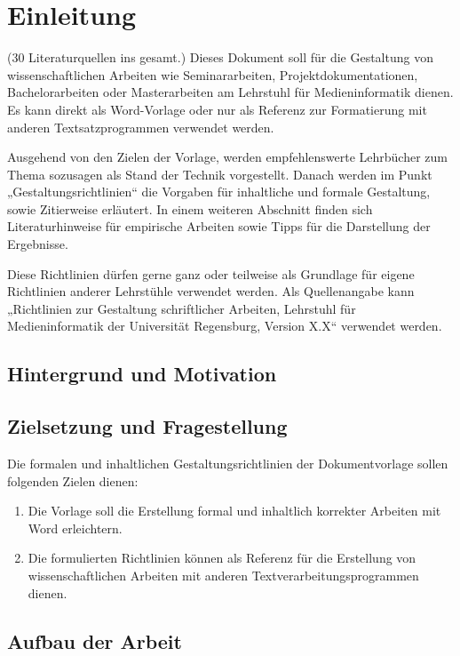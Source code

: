 \chapter{Einleitung}\label{sec:Einleitung}
\pagestyle{headings} %
(30 Literaturquellen ins gesamt.)
Dieses Dokument soll für die Gestaltung von wissenschaftlichen Arbeiten wie Seminararbeiten, Projektdokumentationen, Bachelorarbeiten oder Masterarbeiten am Lehrstuhl für Medieninformatik dienen. Es kann direkt als Word-Vorlage oder nur als Referenz zur Formatierung mit anderen Textsatzprogrammen verwendet werden. 

Ausgehend von den Zielen der Vorlage, werden empfehlenswerte Lehrbücher zum Thema sozusagen als Stand der Technik vorgestellt. Danach werden im Punkt „Gestaltungsrichtlinien“ die Vorgaben für inhaltliche und formale Gestaltung, sowie Zitierweise erläutert. In einem weiteren Abschnitt finden sich Literaturhinweise für empirische Arbeiten sowie Tipps für die Darstellung der Ergebnisse.

Diese Richtlinien dürfen gerne ganz oder teilweise als Grundlage für eigene Richtlinien anderer Lehrstühle verwendet werden. Als Quellenangabe kann „Richtlinien zur Gestaltung schriftlicher Arbeiten, Lehrstuhl für Medieninformatik der Universität Regensburg, Version X.X“ verwendet werden.

\section{Hintergrund und Motivation}

\section{Zielsetzung und Fragestellung}

Die formalen und inhaltlichen Gestaltungsrichtlinien der Dokumentvorlage sollen folgenden Zielen dienen:

\begin{enumerate}
    \item{Die Vorlage soll die Erstellung formal und inhaltlich korrekter Arbeiten mit Word erleichtern.}
    \item{Die formulierten Richtlinien können als Referenz für die Erstellung von wissenschaftlichen Arbeiten mit anderen Textverarbeitungsprogrammen dienen.}
\end{enumerate}

\section{Aufbau der Arbeit}
